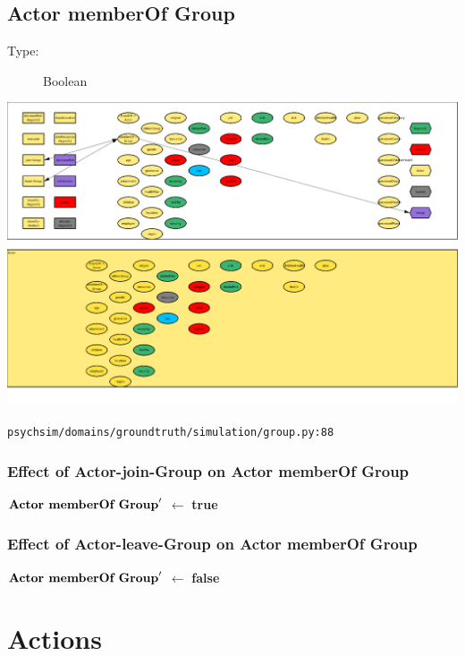 \documentclass{article}%
\begin{document}
%
\subsection{Actor memberOf Group}%
\label{subsec:Actor memberOf Group}%
\begin{description}%
\item[Type:]%
Boolean%
\end{description}%
\includegraphics[width=\textwidth]{images/ActormemberOf->Group.png}%
\begin{flushleft}%
\verb|psychsim/domains/groundtruth/simulation/group.py:88|%
\end{flushleft}%
\subsubsection{Effect of Actor{-}join{-}Group on Actor memberOf Group}%
\label{ssubsec:Effect of Actor{-}join{-}Group on Actor memberOf Group}%
\begin{flushleft}%
$\mbox{\textbf{Actor memberOf Group}} '$%
$\leftarrow$%
\textbf{true}%
\end{flushleft}

%
\subsubsection{Effect of Actor{-}leave{-}Group on Actor memberOf Group}%
\label{ssubsec:Effect of Actor{-}leave{-}Group on Actor memberOf Group}%
\begin{flushleft}%
$\mbox{\textbf{Actor memberOf Group}} '$%
$\leftarrow$%
\textbf{false}%
\end{flushleft}

%
\section{Actions}%
\label{sec:Actions}%
\end{document}
